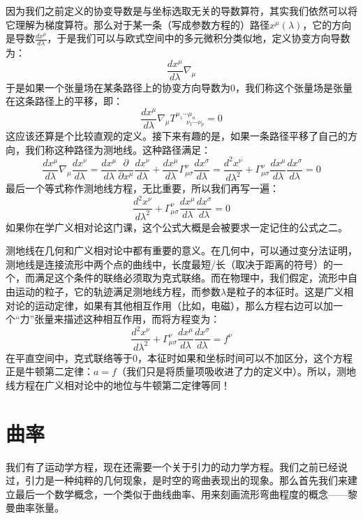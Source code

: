 \documentclass{ctexart}
\begin{document}
因为我们之前定义的协变导数是与坐标选取无关的导数算符，其实我们依然可以将它理解为梯度算符。那么对于某一条（写成参数方程的）路径$x^\mu(\lambda)$，它的方向是导数$\frac{dx^\mu}{d\lambda}$，于是我们可以与欧式空间中的多元微积分类似地，定义协变方向导数为：
\begin{equation}
\frac{dx^\mu}{d\lambda}\nabla_\mu
\end{equation}
于是如果一个张量场在某条路径上的协变方向导数为0，我们称这个张量场是张量在这条路径上的平移，即：
\begin{equation}
\frac{dx^\mu}{d\lambda}\nabla_\mu T^{\mu_1\cdots\mu_n}_{\ \ \ \ \ \ \ \nu_1\cdots\nu_p}=0
\end{equation}
这应该还算是个比较直观的定义。接下来有趣的是，如果一条路径平移了自己的方向，我们称这种路径为测地线。这种路径满足：
\begin{equation}
\frac{dx^\mu}{d\lambda}\nabla_\mu \frac{dx^\nu}{d\lambda}=\frac{dx^\mu}{d\lambda}\frac{\partial}{\partial x^\mu}\frac{dx^\nu}{d\lambda}+\frac{dx^\mu}{d\lambda}\Gamma^\nu_{\mu\sigma}\frac{dx^\sigma}{d\lambda}=\frac{d^2x^\nu}{d\lambda^2}+\Gamma^\nu_{\mu\sigma}\frac{dx^\mu}{d\lambda}\frac{dx^\sigma}{d\lambda}=0
\end{equation}
最后一个等式称作测地线方程，无比重要，所以我们再写一遍：
\begin{equation}
\frac{d^2x^\nu}{d\lambda^2}+\Gamma^\nu_{\mu\sigma}\frac{dx^\mu}{d\lambda}\frac{dx^\sigma}{d\lambda}=0
\end{equation}
如果你在学广义相对论这门课，这个公式大概是会被要求一定记住的公式之二。

测地线在几何和广义相对论中都有重要的意义。在几何中，可以通过变分法证明，测地线是连接流形中两个点的曲线中，长度最短/长（取决于距离的符号）的一个，而满足这个条件的联络必须取为克式联络。而在物理中，我们假定，流形中自由运动的粒子，它的轨迹满足测地线方程，而参数$\lambda$是粒子的本征时。这是广义相对论的运动定律，如果有其他相互作用（比如，电磁），那么方程右边可以加一个“力”张量来描述这种相互作用，而将方程变为：
\begin{equation}
\frac{d^2x^\nu}{d\lambda^2}+\Gamma^\nu_{\mu\sigma}\frac{dx^\mu}{d\lambda}\frac{dx^\sigma}{d\lambda}=f^\nu
\end{equation}
在平直空间中，克式联络等于0，本征时如果和坐标时间可以不加区分，这个方程正是牛顿第二定律：$a=f$（我们只是将质量项吸收进了力的定义中）。所以，测地线方程在广义相对论中的地位与牛顿第二定律等同！

\section{曲率}
我们有了运动学方程，现在还需要一个关于引力的动力学方程。我们之前已经说过，引力是一种纯粹的几何现象，是时空的弯曲表现出的现象。那么首先我们来建立最后一个数学概念，一个类似于曲线曲率、用来刻画流形弯曲程度的概念——黎曼曲率张量。
\end{document}
